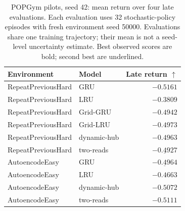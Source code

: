 \begin{table}[H]
\centering
\caption{POPGym pilots, seed 42: mean return over four late evaluations. Each evaluation uses 32 stochastic-policy episodes with fresh environment seed 50000. Evaluations share one training trajectory; their mean is not a seed-level uncertainty estimate. Best observed scores are bold; second best are underlined.}
\label{tab:rl}
\begin{tabular}{llr}
\toprule
Environment & Model & Late return $\uparrow$ \\
\midrule
RepeatPreviousHard & GRU & $-0.5161$ \\
RepeatPreviousHard & LRU & $\mathbf{-0.3809}$ \\
RepeatPreviousHard & Grid-GRU & $-0.4942$ \\
RepeatPreviousHard & Grid-LRU & $-0.4973$ \\
RepeatPreviousHard & dynamic-hub & $-0.4963$ \\
RepeatPreviousHard & two-reads & $\underline{-0.4927}$ \\
\midrule
AutoencodeEasy & GRU & $\underline{-0.4964}$ \\
AutoencodeEasy & LRU & $\mathbf{-0.4663}$ \\
AutoencodeEasy & dynamic-hub & $-0.5072$ \\
AutoencodeEasy & two-reads & $-0.5111$ \\
\bottomrule
\end{tabular}
\end{table}
